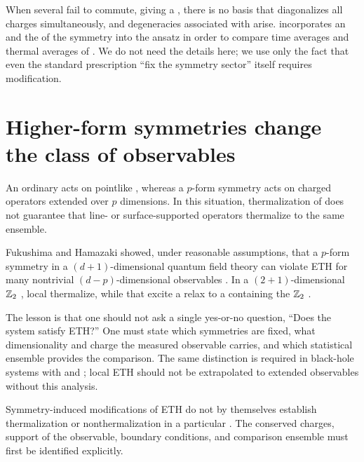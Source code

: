 When several  fail to commute, giving a , there is no basis that diagonalizes all charges simultaneously, and degeneracies associated with  arise.  incorporates an  and the  of the symmetry into the ansatz in order to compare time averages and thermal averages of  \cite{Murthy:2023naETH}. We do not need the details here; we use only the fact that even the standard prescription ``fix the symmetry sector'' itself requires modification.

\section{Higher-form symmetries change the class of observables}

An ordinary  acts on pointlike , whereas a $p$-form symmetry acts on charged operators extended over $p$ dimensions. In this situation, thermalization of  does not guarantee that line- or surface-supported operators thermalize to the same ensemble.

Fukushima and Hamazaki showed, under reasonable assumptions, that a $p$-form symmetry in a $(d+1)$-dimensional quantum field theory can violate ETH for many nontrivial $(d-p)$-dimensional observables \cite{Fukushima:2023svf}. In a $(2+1)$-dimensional $\mathbb{Z}_2$ , local  thermalize, while  that excite a  relax to a  containing the $\mathbb{Z}_2$ .

The lesson is that one should not ask a single yes-or-no question, ``Does the system satisfy ETH?'' One must state which symmetries are fixed, what dimensionality and charge the measured observable carries, and which statistical ensemble provides the comparison. The same distinction is required in black-hole systems with  and ; local ETH should not be extrapolated to extended observables without this analysis.

\begin{warningbox}
Symmetry-induced modifications of ETH do not by themselves establish thermalization or nonthermalization in a particular . The conserved charges, support of the observable, boundary conditions, and comparison ensemble must first be identified explicitly.
\end{warningbox}

